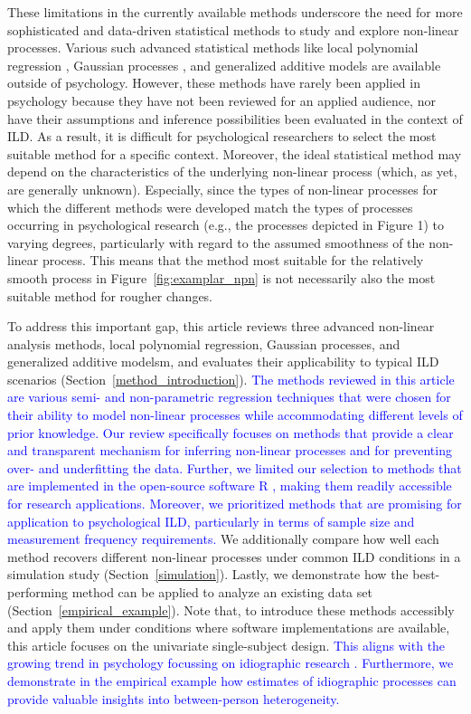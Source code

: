 \documentclass[man, floatsintext]{apa7}
\begin{document}
These limitations in the currently available methods underscore the need for
more sophisticated and data-driven statistical methods to study and explore
non-linear processes. Various such advanced statistical methods like local
polynomial regression \parencite{fan_local_2018}, Gaussian processes
\parencite{rasmussen_gaussian_2006}, and generalized additive models
\parencite{wood_generalized_2006} are available outside of psychology. However,
these methods have rarely been applied in psychology because they have not been
reviewed for an applied audience, nor have their assumptions and inference
possibilities been evaluated in the context of ILD\@. As a result, it is
difficult for psychological researchers to select the most suitable method for
a specific context. Moreover, the ideal statistical method may depend on the
characteristics of the underlying non-linear process (which, as yet,  are
generally unknown). Especially, since the types of non-linear processes for
which the different methods were developed match the types of processes
occurring in psychological research (e.g., the processes depicted in Figure 1)
to varying degrees, particularly with regard to the assumed smoothness of the
non-linear process. This means that the method most suitable for the relatively
smooth process in Figure~\ref{fig:examplar_npn} is not necessarily
also the most suitable method for rougher changes.

To address this important gap, this article reviews three advanced non-linear
analysis methods, local polynomial regression, Gaussian processes, and
generalized additive modelsm, and evaluates their applicability to typical ILD
scenarios (Section~\ref{method_introduction}). \textcolor{blue}{ The methods
  reviewed in this article are various semi- and non-parametric regression
  techniques that were chosen for their ability to model non-linear processes
  while accommodating different levels of prior knowledge. Our review
  specifically focuses on methods that provide a clear and transparent
  mechanism
  for inferring non-linear processes and for preventing over- and underfitting
  the
  data. Further, we limited our selection to methods that are implemented
  in
  the open-source software R \parencite{R-base}, making them readily accessible
  for research applications. Moreover, we prioritized methods that are
  promising
  for application to psychological ILD, particularly in terms of sample size
  and
  measurement frequency requirements.} We additionally compare how well each
method recovers different non-linear processes under common ILD conditions in a
simulation study (Section~\ref{simulation}). Lastly, we demonstrate how the
best-performing method can be applied to analyze an existing data set
(Section~\ref{empirical_example}). Note that, to introduce these methods
accessibly and apply them under conditions where software implementations are
available, this article focuses on the univariate single-subject design.
\textcolor{blue}{ This aligns with the growing trend in psychology focussing on
  idiographic research \parencite{molenaar_manifesto_2004,hamaker_why_2012}.
  Furthermore, we demonstrate in the empirical example how estimates of
  idiographic processes can provide valuable insights into between-person
  heterogeneity.}
\end{document}
